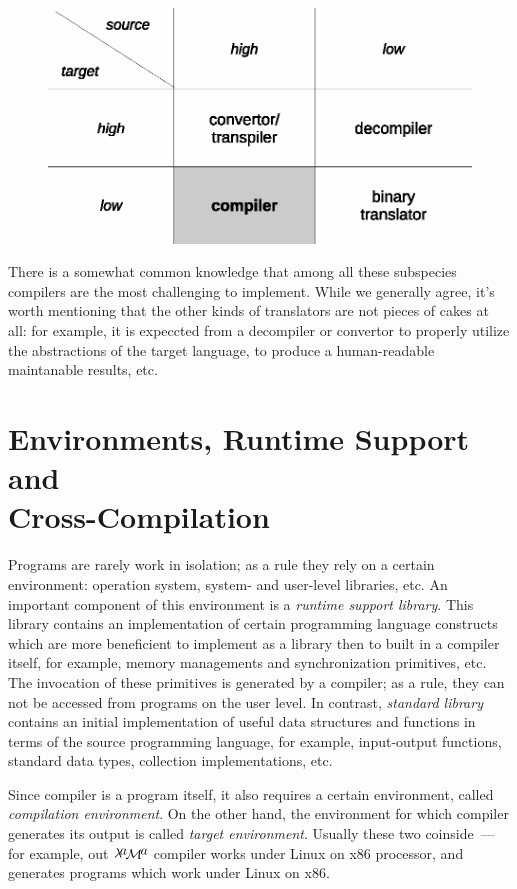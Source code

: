 \documentclass{book}
\newcommand{\lama}{$\lambda\kern -.1667em\lower -.5ex\hbox{$a$}\kern -.1000em\lower .2ex\hbox{$\mathcal M$}\kern -.1000em\lower -.5ex\hbox{$a$}$\xspace}
\begin{document}
\begin{figure}[h]
  \centering
  \includegraphics[scale=0.7]{images/01-05.eps}
\end{figure}

There is a somewhat common knowledge that among all these subspecies compilers are the most challenging to implement. While
we generally agree, it's worth mentioning that the other kinds of translators are not pieces of cakes at all: for example,
it is expeccted from a decompiler or convertor to properly utilize the abstractions of the target language, to produce a
human-readable maintanable results, etc.

\section{Environments, Runtime Support and\\
  Cross-Compilation}

Programs are rarely work in isolation; as a rule they rely on a certain environment: operation system, system- and user-level
libraries, etc. An important component of this environment is a \emph{runtime support library}. This library contains
an implementation of certain programming language constructs which are more beneficient to implement as a
library then to built in a compiler itself, for example, memory managements and synchronization primitives, etc. The
invocation of these primitives is generated by a compiler; as a rule, they can not be accessed from programs on the user level.
In contrast, \emph{standard library} contains an initial implementation of useful data structures and functions
in terms of the source programming language, for example, input-output functions, standard data types, collection implementations, etc.

Since compiler is a program itself, it also requires a certain environment, called \emph{compilation environment}.
On the other hand, the environment for which compiler generates its output is called \emph{target environment}. Usually these two
coinside~--- for example, out \lama compiler works under Linux on x86 processor, and generates programs which work
under Linux on x86.
\end{document}
